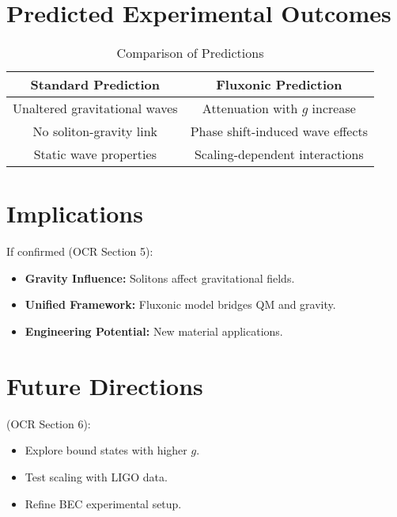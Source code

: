 \documentclass{article}
\begin{document}
\section{Predicted Experimental Outcomes}
\begin{table}[h]
    \centering
    \begin{tabular}{|c|c|}
        \hline
        \textbf{Standard Prediction} & \textbf{Fluxonic Prediction} \\
        \hline
        Unaltered gravitational waves & Attenuation with \(g\) increase \\
        No soliton-gravity link & Phase shift-induced wave effects \\
        Static wave properties & Scaling-dependent interactions \\
        \hline
    \end{tabular}
    \caption{Comparison of Predictions}
    \label{tab:predictions}
\end{table}

\section{Implications}
If confirmed (OCR Section 5):
\begin{itemize}
    \item \textbf{Gravity Influence:} Solitons affect gravitational fields.
    \item \textbf{Unified Framework:} Fluxonic model bridges QM and gravity.
    \item \textbf{Engineering Potential:} New material applications.
\end{itemize}

\section{Future Directions}
(OCR Section 6):
\begin{itemize}
    \item Explore bound states with higher \(g\).
    \item Test scaling with LIGO data.
    \item Refine BEC experimental setup.
\end{itemize}
\end{document}
